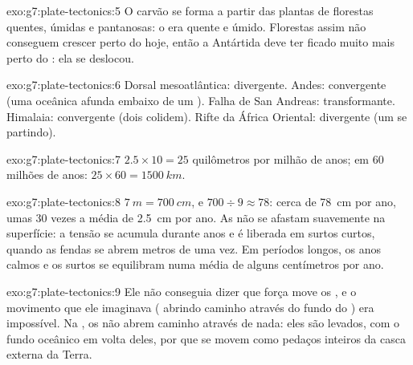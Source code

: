\begin{solution}{exo:g7:plate-tectonics:5}
O carvão se forma a partir das plantas de florestas quentes, úmidas e
pantanosas: o  era quente e úmido. Florestas assim não conseguem
crescer perto do  hoje, então a Antártida deve ter ficado muito
mais perto do : ela se deslocou.
\end{solution}

\begin{solution}{exo:g7:plate-tectonics:6}
Dorsal mesoatlântica: divergente. Andes: convergente (uma  oceânica
afunda embaixo de um ). Falha de San Andreas: transformante.
Himalaia: convergente (dois  colidem). Rifte da África
Oriental: divergente (um  se partindo).
\end{solution}

\begin{solution}{exo:g7:plate-tectonics:7}
$2.5 \times 10 = 25$ quilômetros por milhão de anos; em 60 milhões de
anos: $25 \times 60 = \qty{1500}{km}$.
\end{solution}

\begin{solution}{exo:g7:plate-tectonics:8}
$\qty{7}{m} = \qty{700}{cm}$, e $700 \div 9 \approx 78$: cerca de
\qty{78}{cm} por ano, umas 30 vezes a média de \qty{2.5}{cm} por ano. As
 não se afastam suavemente na superfície: a tensão se acumula
durante anos e é liberada em surtos curtos, quando as fendas se abrem
metros de uma vez. Em períodos longos, os anos calmos e os surtos se
equilibram numa média de alguns centímetros por ano.
\end{solution}

\begin{solution}{exo:g7:plate-tectonics:9}
Ele não conseguia dizer que força move os , e o movimento que
ele imaginava ( abrindo caminho através do fundo do ) era
impossível. Na , os  não abrem caminho
através de nada: eles são levados, com o fundo oceânico em volta deles, por
 que se movem como pedaços inteiros da casca externa da Terra.
\end{solution}

